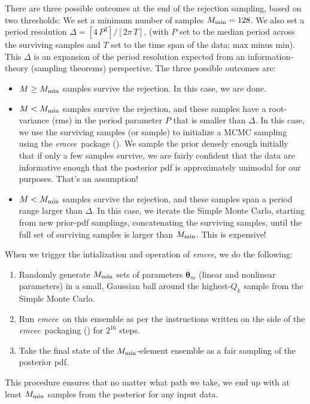 \documentclass[manuscript, letterpaper]{aastex6}
\newcommand{\project}[1]{\textsl{#1}}
\newcommand{\emcee}{\project{emcee}}
\newcommand{\bs}[1]{\boldsymbol{#1}}
\begin{document}
There are three possible outcomes at the end of the rejection
sampling, based on two thresholds:
We set a minimum number of samples $M_{\rm min}=128$.
We also set a period resolution $\Delta = [4\,P^2] / [2\pi\,T]$, (with
$P$ set to the median period across the surviving samples and $T$ set to
the time span of the data; max minus min).
This $\Delta$ is an expansion of the period
resolution expected from an information-theory (sampling theorems) perspective.
The three possible outcomes are:
\begin{itemize}
\item $M\geq M_{\rm min}$ samples survive the rejection.
  In this case, we are done.
\item $M<M_{\rm min}$ samples survive the rejection, and these samples
  have a root-variance (rms) in the period parameter $P$ that is
  smaller than $\Delta$.
  In this case, we use the surviving samples (or sample) to
  initialize a MCMC sampling using the \emcee\ package
  (\citealt{Foreman-Mackey:2013}).
  We sample the
  prior densely enough initially that if only a few samples survive,
  we are fairly confident that the data are informative enough that
  the posterior pdf is approximately unimodal for our purposes. That's
  an assumption!
\item $M<M_{\rm min}$ samples survive the rejection, and these samples
  span a period range larger than $\Delta$.
  In this case, we iterate the Simple
  Monte Carlo, starting from new prior-pdf samplings, concatenating
  the surviving samples, until the full set of surviving samples is
  larger than $M_{\rm min}$. This is expensive!
\end{itemize}
When we trigger the intialization and operation of \emcee, we do the following:
\begin{enumerate}
\item Randomly generate $M_{\rm min}$ sets of parameters $\bs{\theta}_m$
  (linear and nonlinear parameters) in a small, Gaussian ball around
  the highest-$Q_k$ sample from the Simple Monte Carlo.
\item Run \emcee\ on this ensemble as per the instructions written on the side
  of the \emcee\ packaging (\citealt{Foreman-Mackey:2013}) for $2^{16}$ steps.
\item Take the final state of the $M_{\rm min}$-element ensemble as a
  fair sampling of the posterior pdf.
\end{enumerate}
This procedure ensures that no matter what path we take, we end up with
at least $M_{\rm min}$ samples from the posterior for any input data.
\end{document}
